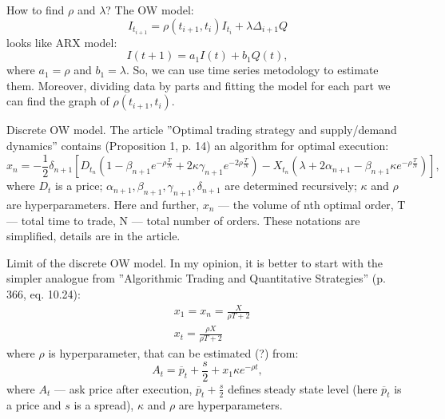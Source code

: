 \documentclass[aspectratio=169]{beamer}
\begin{document}
\begin{frame}{How to find $\rho$ and $\lambda$?}
    The OW model:
    \begin{equation}
        I_{t_{i+1}} = \rho (t_{i + 1}, t_i) I_{t_i} + \lambda \Delta_{i + 1} Q
    \end{equation}
    looks like ARX model:
    \begin{equation*}
        I(t + 1) = a_1 I(t) + b_1 Q(t),
    \end{equation*}
    where $a_1 = \rho$ and $b_1 = \lambda$. So, we can use time series metodology to estimate them.
    Moreover, dividing data by parts and fitting the model for each part we can find the graph of $\rho (t_{i + 1}, t_i)$.
\end{frame}

\begin{frame}{Discrete OW model.}
    The article ''Optimal trading strategy and supply/demand dynamics'' contains (Proposition 1, p. 14) 
    an algorithm for optimal execution:
    \begin{equation*}
        x_n = - \frac{1}{2} \delta_{n + 1} [D_{t_n} (1 - \beta_{n + 1} e^{ - \rho \frac{T}{N}} + 2 \kappa \gamma_{n+1} e^{ - 2 \rho \frac{T}{N}}) 
        - X_{t_n} (\lambda + 2 \alpha_{n+1} - \beta_{n+1}\kappa e^{ - \rho \frac{T}{N}}) ], 
    \end{equation*}
    where $D_t$ is a price; $\alpha_{n+1}, \beta_{n+1}, \gamma_{n+1}, \delta_{n + 1}$ are determined recursively; $\kappa$ and $\rho$ 
    are hyperparameters. Here and further, $x_n$ --- the volume of nth optimal order, T --- total time to trade, N --- total number of
    orders. These notations are simplified, details are in the article. 
\end{frame}

\begin{frame}{Limit of the discrete OW model.}
    In my opinion, it is better to start with the simpler analogue from ''Algorithmic Trading and
    Quantitative Strategies'' (p. 366, eq. 10.24):
    \begin{align*}
        & x_1 = x_n = \frac{X}{\rho T + 2} \\
        & x_t = \frac{\rho X}{\rho T + 2}
    \end{align*}
    where $\rho$ is hyperparameter, that can be estimated (?) from:
    \begin{equation*}
        A_t = \overline p _t + \frac{s}{2} + x_1 \kappa e^{- \rho t},
    \end{equation*}
    where $A_t$ --- ask price after execution, $\overline p _t + \frac{s}{2}$ defines steady state level 
    (here $\overline p _t$ is a price and $s$ is a spread), $\kappa$ and $\rho$ are hyperparameters. 
\end{frame}
\end{document}

